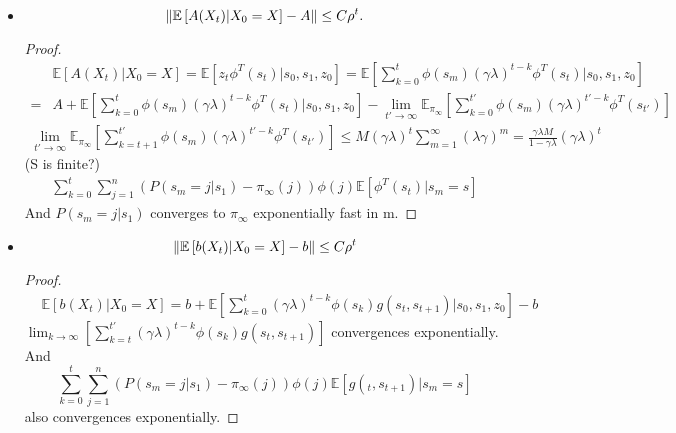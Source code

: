 \begin{itemize}
    \item 
        \[
            \Arrowvert \mathbb{E} \left[ A(X_t) | X_0 = X \right] - A \Arrowvert \le C \rho^t.
        \]
        \begin{proof}
            \begin{align*}
                &\mathbb{E} \left[ A(X_t) | X_0 = X \right] 
                = \mathbb{E} \left[ z_t \phi^T{(s_t)} | s_0, s_1, z_0 \right] 
                = \mathbb{E}\left[ \sum^{t}_{k=0} \phi(s_m) {(\gamma\lambda)}^{t-k} \phi^T(s_t) | s_0, s_1, z_0 \right]\\
                =& A + \mathbb{E}\left[ \sum^{t}_{k=0} \phi(s_m) {(\gamma\lambda)}^{t-k} \phi^T(s_t) | s_0, s_1, z_0 \right]
                - \lim_{t' \to \infty} \mathbb{E}_{\pi_{\infty}}\left[ \sum^{t'}_{k=0} \phi(s_m) {(\gamma\lambda)}^{t'-k} \phi^T(s_{t'}) \right]
            \end{align*}
            \begin{align*}
                \lim_{t' \to \infty} \mathbb{E}_{\pi_{\infty}}\left[ \sum^{t'}_{k=t+1} \phi(s_m) {(\gamma\lambda)}^{t'-k} \phi^T(s_{t'}) \right] \le M {(\gamma\lambda)}^{t} \sum^{\infty}_{m = 1} {(\lambda\gamma)}^{m} 
                = \frac{\gamma\lambda M}{1 - \gamma\lambda} {(\gamma\lambda)}^{t}
            \end{align*}
            (S is finite?)
            \begin{align*}
                \sum^{t}_{k = 0} \sum^{n}_{j=1} \left( P\left( s_m = j | s_1 \right) - \pi_{\infty}(j) \right) \phi(j) \mathbb{E} \left[ \phi^T(s_t) | s_m = s \right]
            \end{align*}
            And $ P\left( s_m = j | s_1 \right) $ converges to $ \pi_{\infty} $ exponentially fast in m.
        \end{proof}
    \item 
        \[
            \Arrowvert \mathbb{E}\left[ b(X_t) | X_0 = X \right] - b \Arrowvert \le C \rho^t
        \]
        \begin{proof}
            \begin{align*}
                &\mathbb{E}\left[ b(X_t) | X_0 = X \right] = b + \mathbb{E}\left[ \sum^{t}_{k=0} {(\gamma\lambda)}^{t-k} \phi(s_k) g(s_t, s_{t+1}) | s_0, s_1, z_0 \right] - b
            \end{align*}
            $ \lim_{k \to \infty} \left[ \sum^{t'}_{k = t} {(\gamma\lambda)}^{t-k}\phi(s_k) g(s_t, s_{t+1}) \right] $ convergences exponentially. And
            \[
                \sum^{t}_{k=0} \sum^{n}_{j=1} \left( P(s_m = j | s_1) - \pi_{\infty}(j) \right) \phi(j)\mathbb{E}\left[ g(_t, s_{t+1}) | s_m = s \right]
            \]
            also convergences exponentially.
        \end{proof}
\end{itemize}

